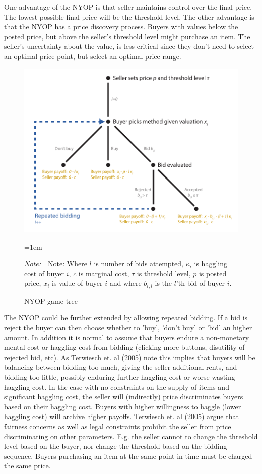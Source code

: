 \documentclass[a4paper,12pt]{article}
\newcommand{\Figtext}[1]{%
	\begin{tablenotes}[para,flushleft]
		\hangindent=1em
		\footnotesize
		\raggedright
		#1
	\end{tablenotes}
}
\newcommand{\Fignote}[1]{\Figtext{\emph{Note:~}~#1}}
\begin{document}
	One advantage of the NYOP is that seller maintains control over the final price. The lowest possible final price will be the threshold level. The other advantage is that the NYOP has a price discovery process. Buyers with values below the posted price, but above the seller's threshold level might purchase an item. The seller's uncertainty about the value, is less critical since they don't need to select an optimal price point, but select an optimal price range.

	\begin{figure}
	        \centering
	        \caption{NYOP game tree}
	        \includegraphics[width=\textwidth]{Figures/NYOP_GameTree}
			\label{fig:game_tree}
			\Fignote{Note: Where $l$ is number of bids attempted, $\kappa_i$ is haggling cost of buyer $i$, $c$ is marginal cost, $\tau$ is threshold level, $p$ is posted price, $x_i$ is value of buyer $i$ and where $b_{i,l}$ is the $l$'th bid of buyer $i$.}
	\end{figure}

	The NYOP could be further extended by allowing repeated bidding. If a bid is reject the buyer can then choose whether to 'buy', 'don't buy' or 'bid' an higher amount. In addition it is normal to assume that buyers endure a non-monetary mental cost or haggling cost from bidding (clicking more buttons, disutility of rejected bid, etc). As Terwiesch et. al (2005) note this implies that buyers will be balancing between bidding too much, giving the seller additional rents, and bidding too little, possibly enduring further haggling cost or worse wasting haggling cost. In the case with no constraints on the supply of items and significant haggling cost, the seller will (indirectly) price discriminates buyers based on their haggling cost. Buyers with higher willingness to haggle (lower haggling cost) will archive higher payoffs. Terwiesch et. al (2005) argue that fairness concerns as well as legal constraints prohibit the seller from price discriminating on other parameters. E.g. the seller cannot to change the threshold level based on the buyer, nor change the threshold based on the bidding sequence. Buyers purchasing an item at the same point in time must be charged the same price.
\end{document}
